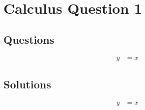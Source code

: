 \chapter{Calculus Question 1}
\label{chap:cq1}

\section{Questions}
\label{sec:cq1q}
\begin{align}
  y &= x
\end{align}

\section{Solutions}
\label{sec:cq1s}
\begin{align}
  y &= x
\end{align}